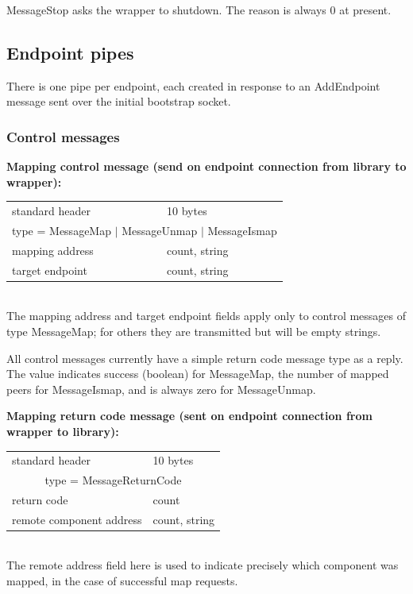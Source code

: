 \documentclass[12pt,a4paper,twoside]{article}
\renewcommand{\_}{\texttt{\symbol{95}}}
\begin{document}
MessageStop asks the wrapper to shutdown.
The reason is always 0 at present.

\subsection{Endpoint pipes}

There is one pipe per endpoint, each created in response to an
AddEndpoint message sent over the initial bootstrap socket.

\subsubsection{Control messages}

\textbf{Mapping control message (send on endpoint connection from
library to wrapper):}

\begin{tabular}{|ll|}
\hline
standard header    & 10 bytes\\
\multicolumn{2}{|c|}{type = MessageMap $|$ MessageUnmap $|$ MessageIsmap}\\
\hline
mapping address    & count, string\\
target endpoint    & count, string\\
\hline
\end{tabular}\\

The mapping address and target endpoint fields apply only to control messages
of type MessageMap; for others they are transmitted but will be empty strings.

All control messages currently have a simple return code message type
as a reply. The value indicates success (boolean) for MessageMap,
the number of mapped peers for MessageIsmap, and is always zero for
MessageUnmap.

\textbf{Mapping return code message (sent on endpoint connection
from wrapper to library):}

\begin{tabular}{|ll|}
\hline
standard header    & 10 bytes\\
\multicolumn{2}{|c|}{type = MessageReturnCode}\\
\hline
return code        & count\\
remote component address & count, string\\
\hline
\end{tabular}\\

The remote address field here is used to indicate precisely which
component was mapped, in the case of successful map requests.
\end{document}
